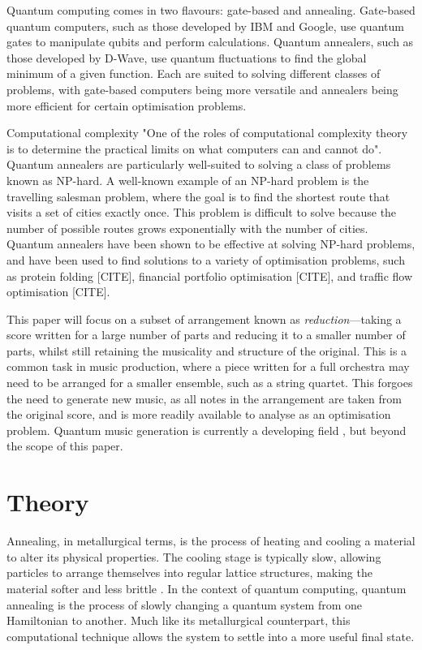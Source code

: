 \documentclass[aps,pra,10pt,twocolumn]{revtex4-2}
\begin{document}
Quantum computing comes in two flavours: gate-based and annealing. Gate-based quantum computers, such as those developed by IBM and Google, use quantum gates to manipulate qubits and perform calculations. Quantum annealers, such as those developed by D-Wave, use quantum fluctuations to find the global minimum of a given function. Each are suited to solving different classes of problems, with gate-based computers being more versatile and annealers being more efficient for certain optimisation problems. 

Computational complexity "One of the roles of computational complexity theory is to determine the practical limits on what computers can and cannot do". Quantum annealers are particularly well-suited to solving a class of problems known as NP-hard. A well-known example of an NP-hard problem is the travelling salesman problem, where the goal is to find the shortest route that visits a set of cities exactly once. This problem is difficult to solve because the number of possible routes grows exponentially with the number of cities. Quantum annealers have been shown to be effective at solving NP-hard problems, and have been used to find solutions to a variety of optimisation problems, such as protein folding [CITE], financial portfolio optimisation [CITE], and traffic flow optimisation [CITE].

This paper will focus on a subset of arrangement known as \textit{reduction}—taking a score written for a large number of parts and reducing it to a smaller number of parts, whilst still retaining the musicality and structure of the original. This is a common task in music production, where a piece written for a full orchestra may need to be arranged for a smaller ensemble, such as a string quartet. This forgoes the need to generate new music, as all notes in the arrangement are taken from the original score, and is more readily available to analyse as an optimisation problem. Quantum music generation is currently a developing field \cite{miranda_quantum_2022}, but beyond the scope of this paper. 

\section{Theory}

Annealing, in metallurgical terms, is the process of heating and cooling a material to alter its physical properties. The cooling stage is typically slow, allowing particles to arrange themselves into regular lattice structures, making the material softer and less brittle \cite{oed_annealing_2024}. In the context of quantum computing, quantum annealing is the process of slowly changing a quantum system from one Hamiltonian to another. Much like its metallurgical counterpart, this computational technique allows the system to settle into a more useful final state.
\end{document}
